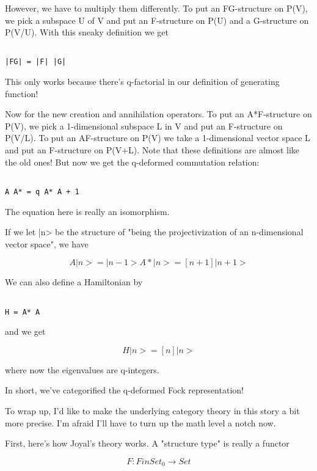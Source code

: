 However, we have to multiply them differently.  To put an FG-structure
on P(V), we pick a subspace U of V and put an F-structure on P(U) and
a G-structure on P(V/U).  With this sneaky definition we get


\begin{verbatim}

|FG| = |F| |G| 
\end{verbatim}
    
This only works because there's q-factorial in our definition of
generating function!  

Now for the new creation and annihilation operators.  To put 
an A*F-structure on P(V), we pick a 1-dimensional subspace L in V
and put an F-structure on P(V/L).  To put an AF-structure on P(V)
we take a 1-dimensional vector space L and put an F-structure on
P(V+L).  Note that these definitions are almost like the old ones!
But now we get the q-deformed commutation relation:


\begin{verbatim}

A A* = q A* A + 1
\end{verbatim}
    
The equation here is really an isomorphism.   

If we let |n> be the structure of "being the projectivization of an
n-dimensional vector space", we have


$$

 A|n>  =        |n-1>
A*|n>  =  [n+1] |n+1>
$$
    
We can also define a Hamiltonian by


\begin{verbatim}

H = A* A
\end{verbatim}
    
and we get


$$

H|n> = [n] |n>
$$
    
where now the eigenvalues are q-integers.  

In short, we've categorified the q-deformed Fock representation!

To wrap up, I'd like to make the underlying category theory in this
story a bit more precise.   I'm afraid I'll have to turn up the math
level a notch now.

First, here's how Joyal's theory works.   A "structure type" is 
really a functor


$$

F: FinSet_{0} \to  Set
$$
    
